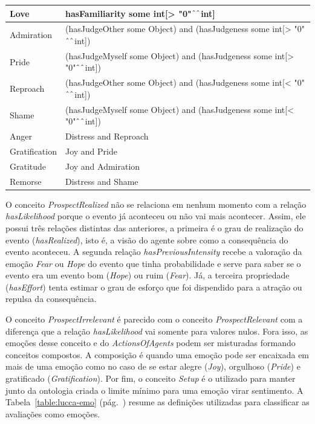 \begin{table}[pt]
\begin{center}
\begin{tabular}{|p{20mm}|p{120mm}|}
		Love & hasFamiliarity some int[> "0"$\UP\UP$int]\\ \hline
		Admiration & (hasJudgeOther some Object) and (hasJudgeness some int[> "0"$\UP\UP$int])\\ \hline
		Pride & (hasJudgeMyself some Object) and (hasJudgeness some int[> "0"$\UP\UP$int])\\ \hline
		Reproach & (hasJudgeOther some Object) and (hasJudgeness some int[< "0"$\UP\UP$int])\\ \hline
		Shame & (hasJudgeMyself some Object) and (hasJudgeness some int[< "0"$\UP\UP$int])\\ \hline
		Anger & Distress and Reproach \\ \hline
		Gratification &  Joy and Pride \\ \hline
		Gratitude & Joy and Admiration \\ \hline
		Remorse & Distress and Shame \\ \hline
	\end{tabular}
	\end{center}
\end{table}

O conceito \emph{ProspectRealized} não se relaciona em nenhum momento com a
relação \emph{hasLikelihood} porque o evento já aconteceu ou não vai mais
acontecer. Assim, ele possui três relações distintas das anteriores, a
primeira é o grau de realização do evento (\emph{hasRealized}), isto é, a
visão do agente sobre como a consequência do evento aconteceu. A segunda
relação \emph{hasPreviousIntensity} recebe a valoração da emoção \emph{Fear}
ou \emph{Hope} do evento que tinha probabilidade e serve para saber se o evento era
um evento bom (\emph{Hope}) ou ruim (\emph{Fear}). Já, a terceira propriedade
(\emph{hasEffort}) tenta estimar o grau de esforço que foi dispendido para a
atração ou repulsa da consequência.

O conceito \emph{ProspectIrrelevant} é parecido com o conceito
\emph{ProspectRelevant} com a diferença que a relação \emph{hasLikelihood} vai
somente para valores nulos. Fora isso, as emoções desse conceito e do
\emph{ActionsOfAgents} podem ser misturadas formando conceitos compostos.
A composição é quando uma emoção pode ser encaixada em mais de uma emoção
como no caso de se estar alegre (\emph{Joy}), orgulhoso (\emph{Pride}) e
gratificado (\emph{Gratification}). Por fim, o conceito \emph{Setup}
é o utilizado para manter junto da ontologia criada o limite mínimo para uma
emoção virar sentimento\dev{}. A Tabela~\ref{table:lucca-emo}
(pág.~\pageref{table:lucca-emo}) resume as definições
utilizadas para classificar as avaliações como emoções.

